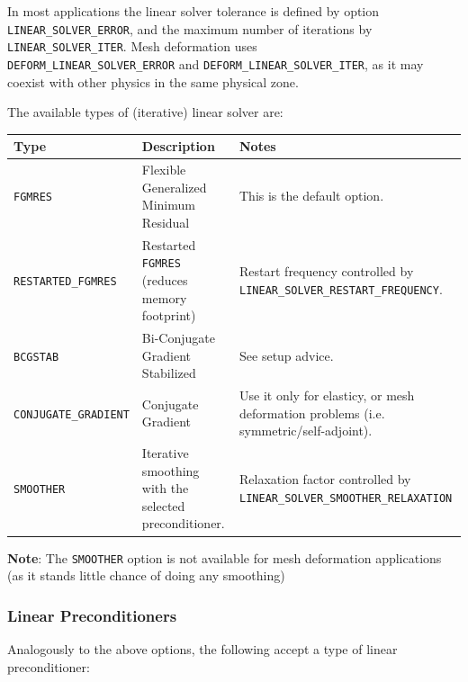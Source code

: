 \documentclass[12pt, a4paper, twoside]{article}
\begin{document}
In most applications the linear solver tolerance is defined by option\\ \verb|LINEAR_SOLVER_ERROR|, and the maximum number of iterations by \verb|LINEAR_SOLVER_ITER|. Mesh deformation uses \\ \verb|DEFORM_LINEAR_SOLVER_ERROR| and \verb|DEFORM_LINEAR_SOLVER_ITER|, as it may coexist with other physics in the same physical zone.

The available types of (iterative) linear solver are:

\vspace{3mm}
\begin{center}
    
\begin{adjustbox}{width=\textwidth}

\begin{tabular}{ p{4cm} p{6cm} p{7cm} }
     \textbf{Type} & \textbf{Description} & \textbf{Notes} \\ [.5ex]
  \hline\hline
  \texttt{FGMRES} & Flexible Generalized Minimum Residual & This is the default option.\\ [1ex]
  \hline
  \texttt{RESTARTED\_FGMRES} & Restarted \verb|FGMRES| (reduces memory footprint) & Restart frequency controlled by \texttt{LINEAR\_SOLVER\_RESTART\_FREQUENCY}. \\ [1ex]
  \hline
  \texttt{BCGSTAB} & Bi-Conjugate Gradient Stabilized & See setup advice. \\ [1ex]
  \hline
  \verb|CONJUGATE_GRADIENT| & Conjugate Gradient & Use it only for elasticy, or mesh deformation problems (i.e. symmetric/self-adjoint). \\ [1ex]
  \hline
  \texttt{SMOOTHER} & Iterative smoothing with the selected preconditioner. & Relaxation factor controlled by \verb|LINEAR_SOLVER_SMOOTHER_RELAXATION| \\ [1ex]
  \hline
  \hline
\end{tabular}
\end{adjustbox}
\end{center}

\textbf{Note}: The \verb|SMOOTHER| option is not available for mesh deformation applications (as it stands little chance of doing any smoothing)

\newpage 
\subsubsection{Linear Preconditioners}
Analogously to the above options, the following accept a type of linear preconditioner:
\end{document}
